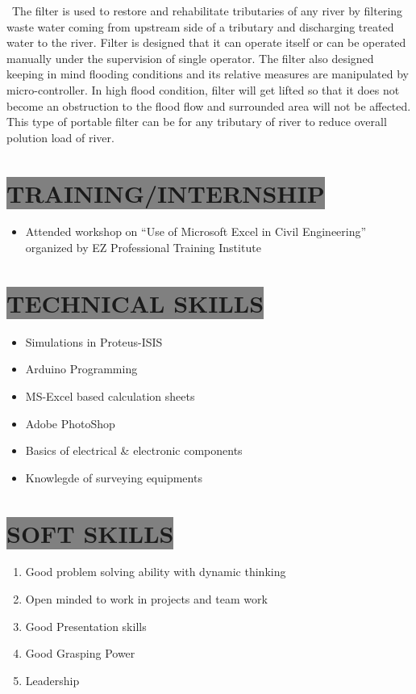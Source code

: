 \documentclass{res} %
\begin{document}
\begin{resume}
\             The filter is used to restore and rehabilitate tributaries of any river by filtering waste water coming from upstream side of a tributary and discharging treated water to the river. Filter is designed that it can operate itself or can be operated manually under the supervision of single operator. The filter also designed keeping in mind flooding conditions and its relative measures are manipulated by micro-controller. In high flood condition, filter will get lifted so that it does not become an obstruction to the flood flow and surrounded area will not be affected. This type of portable filter can be for any tributary of river to reduce overall polution load of river.  \par

\section{
\colorbox{grey}{TRAINING/INTERNSHIP}
}
\begin{itemize}
\item Attended workshop on “Use of Microsoft Excel in Civil Engineering” organized by EZ Professional Training Institute
\end{itemize}   


\section{
\colorbox{grey}{TECHNICAL SKILLS}       
}   
 \begin{itemize} 
 \item Simulations in Proteus-ISIS
 \item Arduino Programming
 \item MS-Excel based calculation sheets 
\item Adobe PhotoShop
\item Basics of electrical {\&} electronic components
\item Knowlegde of surveying equipments

 \end{itemize}

 
\section{
\colorbox{grey}{SOFT SKILLS}          
}
    \begin{enumerate} 
 \item Good problem solving ability with dynamic thinking
 \item Open minded to work in projects and team work
 \item Good Presentation skills
 \item Good Grasping Power
 \item Leadership
 \end{enumerate}







\end{resume}
\end{document}
